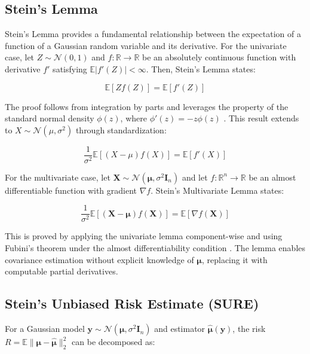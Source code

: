 \documentclass{article}
\begin{document}
\subsection{Stein's Lemma}
Stein's Lemma provides a fundamental relationship between the expectation of a function of a Gaussian random variable and its derivative. For the univariate case, let $Z \sim \mathcal{N}(0, 1)$ and $f: \mathbb{R} \to \mathbb{R}$ be an absolutely continuous function with derivative $f'$ satisfying $\mathbb{E}|f'(Z)| < \infty$. Then, Stein's Lemma states:

\begin{equation}
    \mathbb{E}[Zf(Z)] = \mathbb{E}[f'(Z)]
\end{equation}

The proof follows from integration by parts and leverages the property of the standard normal density $\phi(z)$, where $\phi'(z) = -z\phi(z)$ \cite{Tibshirani2015SteinS}. This result extends to $X \sim \mathcal{N}(\mu, \sigma^2)$ through standardization:

\begin{equation}
    \frac{1}{\sigma^2}\mathbb{E}[(X - \mu)f(X)] = \mathbb{E}[f'(X)]
\end{equation}

For the multivariate case, let $\mathbf{X} \sim \mathcal{N}(\boldsymbol{\mu}, \sigma^2 \mathbf{I}_n)$ and let $f: \mathbb{R}^n \to \mathbb{R}$ be an almost differentiable function with gradient $\nabla f$. Stein's Multivariate Lemma states:

\begin{equation}
    \frac{1}{\sigma^2}\mathbb{E}[(\mathbf{X} - \boldsymbol{\mu})f(\mathbf{X})] = \mathbb{E}[\nabla f(\mathbf{X})]
\end{equation}

This is proved by applying the univariate lemma component-wise and using Fubini's theorem under the almost differentiability condition \cite{Tibshirani2015SteinS}. The lemma enables covariance estimation without explicit knowledge of $\boldsymbol{\mu}$, replacing it with computable partial derivatives.

\subsection{Stein's Unbiased Risk Estimate (SURE)}
For a Gaussian model $\mathbf{y} \sim \mathcal{N}(\boldsymbol{\mu}, \sigma^2 \mathbf{I}_n)$ and estimator $\boldsymbol{\hat{\mu}}(\mathbf{y})$, the risk $R = \mathbb{E}\|\boldsymbol{\mu} - \boldsymbol{\hat{\mu}}\|_2^2$ can be decomposed as:
\end{document}
